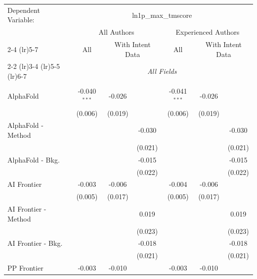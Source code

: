 \begingroup
\centering
\begin{tabular}{lcccccc}
   \tabularnewline \midrule \midrule
   Dependent Variable: & \multicolumn{6}{c}{ln1p\_max\_tmscore}\\
 & \multicolumn{3}{c}{All Authors} & \multicolumn{3}{c}{Experienced Authors} \\
\cmidrule(lr){2-4} \cmidrule(lr){5-7}
 & \multicolumn{1}{c}{All} & \multicolumn{2}{c}{With Intent Data} & \multicolumn{1}{c}{All} & \multicolumn{2}{c}{With Intent Data} \\
\cmidrule(lr){2-2} \cmidrule(lr){3-4} \cmidrule(lr){5-5} \cmidrule(lr){6-7}
 & \multicolumn{6}{c}{\textit{All Fields}} \\ \\
   AlphaFold            & -0.040$^{***}$ & -0.026  &              & -0.041$^{***}$ & -0.026  &   \\   
                        & (0.006)        & (0.019) &              & (0.006)        & (0.019) &   \\   
   AlphaFold - Method   &                &         & -0.030       &                &         & -0.030\\   
                        &                &         & (0.021)      &                &         & (0.021)\\   
   AlphaFold - Bkg.     &                &         & -0.015       &                &         & -0.015\\   
                        &                &         & (0.022)      &                &         & (0.022)\\   
   AI Frontier          & -0.003         & -0.006  &              & -0.004         & -0.006  &   \\   
                        & (0.005)        & (0.017) &              & (0.005)        & (0.017) &   \\   
   AI Frontier - Method &                &         & 0.019        &                &         & 0.019\\   
                        &                &         & (0.023)      &                &         & (0.023)\\   
   AI Frontier - Bkg.   &                &         & -0.018       &                &         & -0.018\\   
                        &                &         & (0.021)      &                &         & (0.021)\\   
   PP Frontier          & -0.003         & -0.010  &              & -0.003         & -0.010  &   \\   

\end{tabular}
